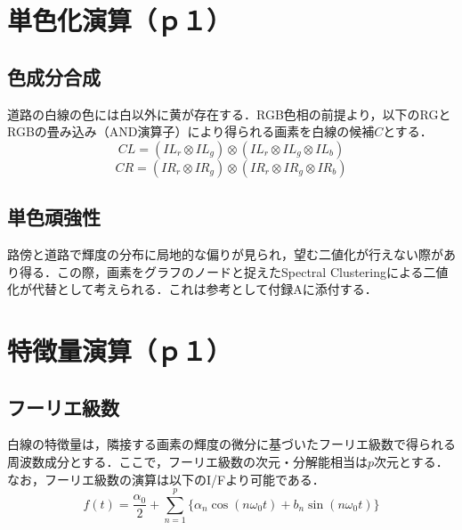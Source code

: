\documentclass{jsarticle}
\begin{document}
\section{単色化演算（ｐ１）}
\label{単色化演算（ｐ１）}



\subsection{色成分合成}
\label{色成分合成}

道路の白線の色には白以外に黄が存在する．RGB色相の前提より，以下のRGとRGBの畳み込み（AND演算子）により得られる画素を白線の候補$C$とする．
\[
CL = (IL_r \otimes IL_g) \otimes (IL_r \otimes IL_g \otimes IL_b)
\]
\[
CR = (IR_r \otimes IR_g) \otimes (IR_r \otimes IR_g \otimes IR_b)
\]
\begin{center}
\end{center}

\subsection{単色頑強性}
\label{単色頑強性}

路傍と道路で輝度の分布に局地的な偏りが見られ，望む二値化が行えない際があり得る．この際，画素をグラフのノードと捉えたSpectral Clusteringによる二値化が代替として考えられる．これは参考として付録Aに添付する．

\section{特徴量演算（ｐ１）}
\label{特徴量演算（ｐ１）}

\subsection{フーリエ級数}
\label{フーリエ級数}

白線の特徴量は，隣接する画素の輝度の微分に基づいたフーリエ級数で得られる周波数成分とする．ここで，フーリエ級数の次元・分解能相当は$p$次元とする．なお，フーリエ級数の演算は以下のI/Fより可能である．
\[
f(t) = \frac{\alpha_0}{2} + \sum_{n=1}^p \{ \alpha_n \cos(n \omega_0 t) + b_n \sin(n \omega_0 t)\}
\]
\begin{center}
\end{center}
\end{document}
